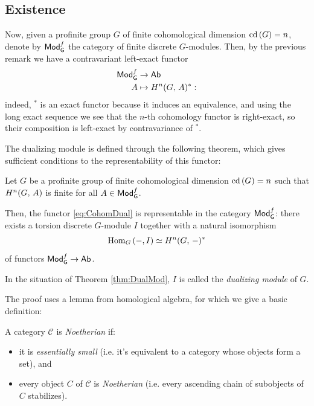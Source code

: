 \documentclass[a4paper, oneside]{memoir}
\begin{document}
\subsection{Existence}

Now, given a profinite group \(G\) of finite cohomological dimension \(\operatorname{cd}{(G)}=n\), denote by \(\mathsf{Mod}_{\mathsf{G}}^f\) the category of finite discrete \(G\)-modules.
Then, by the previous remark we have a contravariant left-exact functor
\begin{align}\label{eq:CohomDual}
	\mathsf{Mod}_{\mathsf{G}}^f & \to \mathsf{Ab}                \\
	A      & \mapsto H^{n}( G, \, A )^*:
\end{align}
indeed, \(^*\) is an exact functor because it induces an equivalence, and using the long exact sequence we see that the \(n\)-th cohomology functor is right-exact, so their composition is left-exact by contravariance of \(^*\).

The dualizing module is defined through the following theorem, which gives sufficient conditions to the representability of this functor:

\begin{theorem}\label{thm:DualMod}
	Let \(G\) be a profinite group of finite cohomological dimension \(\operatorname{cd}{(G)}=n\) such that \(H^{n}( G, \, A )\) is finite for all \(A\in\mathsf{Mod}_{\mathsf{G}}^f\).

	Then, the functor \eqref{eq:CohomDual} is representable in the category \(\mathsf{Mod}_{\mathsf{G}}^f\): there exists a torsion discrete \(G\)-module \(I\) together with a natural isomorphism
	\begin{equation}\label{eq:FuncIso}
		\operatorname{Hom}_G\left( -,I \right) \simeq H^{n}( G, \, - )^*
	\end{equation}
	of functors \(\mathsf{Mod}_{\mathsf{G}}^f\to\mathsf{Ab}\).
\end{theorem}

\begin{definition}
	In the situation of Theorem \ref{thm:DualMod}, \(I\) is called the \textit{dualizing module} of \(G\).
\end{definition}

The proof uses a lemma from homological algebra, for which we give a basic definition:

\begin{definition}
	A category \(\mathcal{C}\) is \textit{Noetherian} if:
	\begin{itemize}
		\item it is \textit{essentially small} (i.e. it's equivalent to a category whose objects form a set), and
		\item every object \(C\) of \(\mathcal{C}\) is \textit{Noetherian} (i.e. every ascending chain of subobjects of \(C\) stabilizes).
	\end{itemize}
\end{definition}
\end{document}

